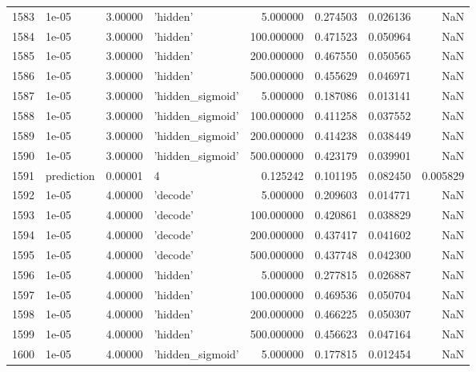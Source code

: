 \documentclass[10pt,a4paper]{article}
\begin{document}
\begin{tabular}{llrlrrrr}
1583 &       1e-05 &   3.00000 &           'hidden' &    5.000000 &  0.274503 &  0.026136 &       NaN \\
1584 &       1e-05 &   3.00000 &           'hidden' &  100.000000 &  0.471523 &  0.050964 &       NaN \\
1585 &       1e-05 &   3.00000 &           'hidden' &  200.000000 &  0.467550 &  0.050565 &       NaN \\
1586 &       1e-05 &   3.00000 &           'hidden' &  500.000000 &  0.455629 &  0.046971 &       NaN \\
1587 &       1e-05 &   3.00000 &   'hidden\_sigmoid' &    5.000000 &  0.187086 &  0.013141 &       NaN \\
1588 &       1e-05 &   3.00000 &   'hidden\_sigmoid' &  100.000000 &  0.411258 &  0.037552 &       NaN \\
1589 &       1e-05 &   3.00000 &   'hidden\_sigmoid' &  200.000000 &  0.414238 &  0.038449 &       NaN \\
1590 &       1e-05 &   3.00000 &   'hidden\_sigmoid' &  500.000000 &  0.423179 &  0.039901 &       NaN \\
1591 &  prediction &   0.00001 &                  4 &    0.125242 &  0.101195 &  0.082450 &  0.005829 \\
1592 &       1e-05 &   4.00000 &           'decode' &    5.000000 &  0.209603 &  0.014771 &       NaN \\
1593 &       1e-05 &   4.00000 &           'decode' &  100.000000 &  0.420861 &  0.038829 &       NaN \\
1594 &       1e-05 &   4.00000 &           'decode' &  200.000000 &  0.437417 &  0.041602 &       NaN \\
1595 &       1e-05 &   4.00000 &           'decode' &  500.000000 &  0.437748 &  0.042300 &       NaN \\
1596 &       1e-05 &   4.00000 &           'hidden' &    5.000000 &  0.277815 &  0.026887 &       NaN \\
1597 &       1e-05 &   4.00000 &           'hidden' &  100.000000 &  0.469536 &  0.050704 &       NaN \\
1598 &       1e-05 &   4.00000 &           'hidden' &  200.000000 &  0.466225 &  0.050307 &       NaN \\
1599 &       1e-05 &   4.00000 &           'hidden' &  500.000000 &  0.456623 &  0.047164 &       NaN \\
1600 &       1e-05 &   4.00000 &   'hidden\_sigmoid' &    5.000000 &  0.177815 &  0.012454 &       NaN \\

\end{tabular}
\end{document}
